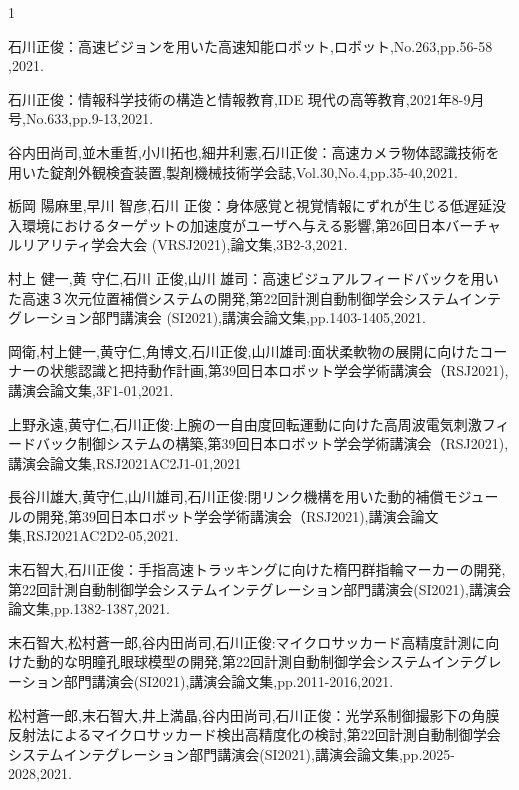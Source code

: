 \begin{発表}{1}


石川正俊：高速ビジョンを用いた高速知能ロボット,ロボット,No.263,pp.56-58 ,2021.

石川正俊：情報科学技術の構造と情報教育,IDE 現代の高等教育,2021年8-9月号,No.633,pp.9-13,2021.

谷内田尚司,並木重哲,小川拓也,細井利憲,石川正俊：高速カメラ物体認識技術を用いた錠剤外観検査装置,製剤機械技術学会誌,Vol.30,No.4,pp.35-40,2021.

栃岡 陽麻里,早川 智彦,石川 正俊：身体感覚と視覚情報にずれが生じる低遅延没入環境におけるターゲットの加速度がユーザへ与える影響,第26回日本バーチャルリアリティ学会大会 (VRSJ2021),論文集,3B2-3,2021.

村上 健一,黄 守仁,石川 正俊,山川 雄司：高速ビジュアルフィードバックを用いた高速３次元位置補償システムの開発,第22回計測自動制御学会システムインテグレーション部門講演会 (SI2021),講演会論文集,pp.1403-1405,2021.

岡衛,村上健一,黄守仁,角博文,石川正俊,山川雄司:面状柔軟物の展開に向けたコーナーの状態認識と把持動作計画,第39回日本ロボット学会学術講演会（RSJ2021),講演会論文集,3F1-01,2021.

上野永遠,黄守仁,石川正俊:上腕の一自由度回転運動に向けた高周波電気刺激フィードバック制御システムの構築,第39回日本ロボット学会学術講演会（RSJ2021),講演会論文集,RSJ2021AC2J1-01,2021

長谷川雄大,黄守仁,山川雄司,石川正俊:閉リンク機構を用いた動的補償モジュールの開発,第39回日本ロボット学会学術講演会（RSJ2021),講演会論文集,RSJ2021AC2D2-05,2021.

末石智大,石川正俊：手指高速トラッキングに向けた楕円群指輪マーカーの開発,第22回計測自動制御学会システムインテグレーション部門講演会(SI2021),講演会論文集,pp.1382-1387,2021.

末石智大,松村蒼一郎,谷内田尚司,石川正俊:マイクロサッカード高精度計測に向けた動的な明瞳孔眼球模型の開発,第22回計測自動制御学会システムインテグレーション部門講演会(SI2021),講演会論文集,pp.2011-2016,2021.

松村蒼一郎,末石智大,井上満晶,谷内田尚司,石川正俊：光学系制御撮影下の角膜反射法によるマイクロサッカード検出高精度化の検討,第22回計測自動制御学会システムインテグレーション部門講演会(SI2021),講演会論文集,pp.2025-2028,2021.


\end{発表}
